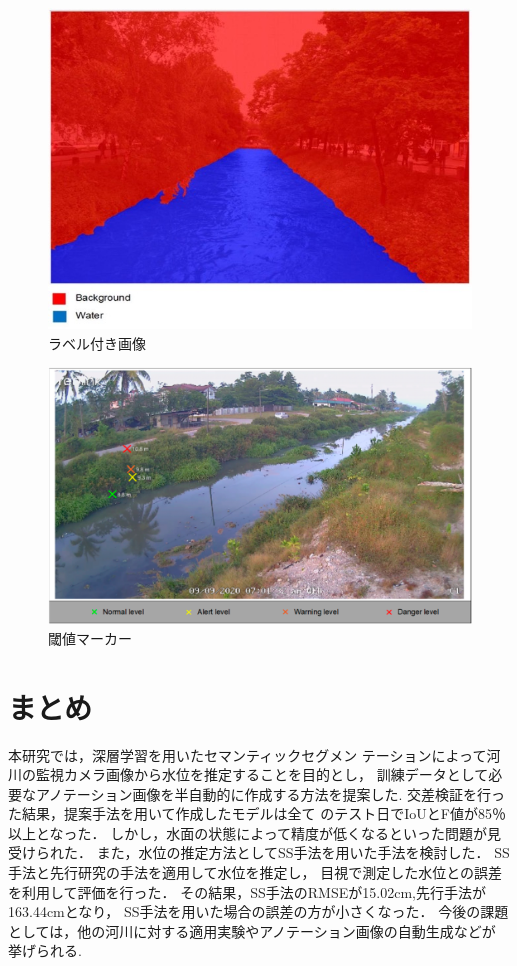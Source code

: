 \begin{figure}[h] 
  \begin{center}
    \includegraphics[width=0.8\linewidth]{image/n_iamge.jpg}
  \end{center}
  \caption{ラベル付き画像}
  \label{seman_ano}
\end{figure}
\begin{figure}[ht]
  \centering
  \includegraphics[width=0.8\linewidth]{image/n_level.png}
  \caption{閾値マーカー}
  \label{level}
\end{figure}
\clearpage
\section{まとめ}
\label{7}
本研究では，深層学習を用いたセマンティックセグメン
テーションによって河川の監視カメラ画像から水位を推定することを目的とし，
訓練データとして必要なアノテーション画像を半自動的に作成する方法を提案した.
交差検証を行った結果，提案手法を用いて作成したモデルは全て
のテスト日でIoUとF値が85％以上となった．
しかし，水面の状態によって精度が低くなるといった問題が見受けられた．
また，水位の推定方法としてSS手法を用いた手法を検討した．
SS手法と先行研究の手法を適用して水位を推定し，
目視で測定した水位との誤差を利用して評価を行った．
その結果，SS手法のRMSEが15.02cm,先行手法が163.44cmとなり，
SS手法を用いた場合の誤差の方が小さくなった．
今後の課題としては，他の河川に対する適用実験やアノテーション画像の自動生成などが
挙げられる.

